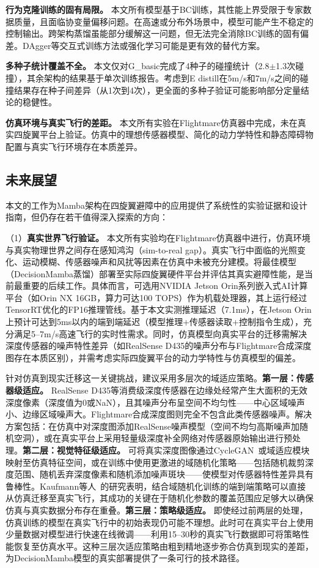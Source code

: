 \documentclass[12pt,a4paper]{article}
\numberwithin{equation}{section}
\numberwithin{figure}{section}
\numberwithin{table}{section}
\begin{document}
\textbf{行为克隆训练的固有局限。} 本文所有模型基于BC训练，其性能上界受限于专家数据质量，且面临协变量偏移问题。在高速或分布外场景中，模型可能产生不稳定的控制输出。跨架构蒸馏虽能部分缓解这一问题，但无法完全消除BC训练的固有偏差。DAgger等交互式训练方法或强化学习可能是更有效的替代方案。

\textbf{多种子统计覆盖不全。} 本文仅对G\_basic完成了4种子的碰撞统计（2.8$\pm$1.3次碰撞），其余架构的结果基于单次训练报告。考虑到E distill在5m/s和7m/s之间的碰撞结果存在种子间差异（从1次到4次），更全面的多种子验证可能影响部分定量结论的稳健性。

\textbf{仿真环境与真实飞行的差距。} 本文所有实验在Flightmare仿真器中完成，未在真实四旋翼平台上验证。仿真中的理想传感器模型、简化的动力学特性和静态障碍物配置与真实飞行环境存在本质差异。

\subsection{未来展望}

本文的工作为Mamba架构在四旋翼避障中的应用提供了系统性的实验证据和设计指南，但仍存在若干值得深入探索的方向：

（1）\textbf{真实世界飞行验证。} 本文所有实验均在Flightmare仿真器\cite{shah2017flightmare}中进行，仿真环境与真实物理世界之间存在感知鸿沟（sim-to-real gap）。真实飞行中面临的光照变化、运动模糊、传感器噪声和风扰等因素在仿真中未被充分建模。将最佳模型（DecisionMamba蒸馏）部署至实际四旋翼硬件平台并评估其真实避障性能，是当前最重要的后续工作。具体而言，可选用NVIDIA Jetson Orin系列嵌入式AI计算平台（如Orin NX 16GB，算力可达100 TOPS）作为机载处理器，其上运行经过TensorRT优化的FP16推理管线。基于本文实测推理延迟（7.1ms），在Jetson Orin上预计可达到5ms以内的端到端延迟（模型推理+传感器读取+控制指令生成），充分满足5--7m/s高速飞行的实时性需求。同时，仿真模型向真实平台的迁移需解决深度传感器的噪声特性差异（如RealSense D435的噪声分布与Flightmare合成深度图存在本质区别），并需考虑实际四旋翼平台的动力学特性与仿真模型的偏差。

针对仿真到现实迁移这一关键挑战，建议采用多层次的域适应策略。\textbf{第一层：传感器级适应。} RealSense D435等消费级深度传感器在边缘处经常产生大面积的无效深度像素（深度值为0或NaN），且其噪声分布呈空间不均匀性——中心区域噪声小、边缘区域噪声大。Flightmare合成深度图则完全不包含此类传感器噪声。解决方案包括：在仿真中对深度图添加RealSense噪声模型（空间不均匀高斯噪声加随机空洞），或在真实平台上采用轻量级深度补全网络对传感器原始输出进行预处理。\textbf{第二层：视觉特征级适应。} 可将真实深度图像通过CycleGAN~\cite{zhu2017cyclegan}或域适应模块映射至仿真特征空间，或在训练中使用更激进的域随机化策略——包括随机裁剪深度范围、随机丢弃深度像素和随机添加噪声斑块——使模型对传感器特性差异具有鲁棒性。Kaufmann等人~\cite{kaufmann2023champion}的研究表明，结合域随机化训练的端到端策略可以直接从仿真迁移至真实飞行，其成功的关键在于随机化参数的覆盖范围应足够大以确保仿真与真实数据分布存在重叠。\textbf{第三层：策略级适应。} 即使经过前两层的处理，仿真训练的模型在真实飞行中的初始表现仍可能不理想。此时可在真实平台上使用少量数据对模型进行快速在线微调——利用15--30秒的真实飞行数据即可将策略性能恢复至仿真水平。这种三层次适应策略由粗到精地逐步弥合仿真到现实的差距，为DecisionMamba模型的真实部署提供了一条可行的技术路径。
\end{document}
